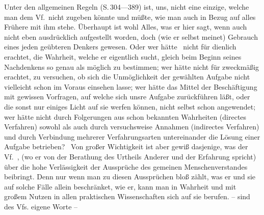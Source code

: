 Unter den allgemeinen Regeln (S.\,304---389) ist,  uns, nicht eine einzige, welche man dem Vf.\ nicht zugeben könnte und müßte, wie man auch in Bezug auf alles Frühere mit ihm stehe. Überhaupt ist wohl Alles, was er hier sagt, wenn auch nicht eben ausdrücklich aufgestellt worden, doch (wie er selbst meinet) Gebrauch eines jeden geübteren Denkers gewesen. Oder wer hätte \zB\ nicht für dienlich erachtet, die Wahrheit, welche er eigentlich sucht, gleich beim Beginn seines Nachdenkens so genau als möglich zu bestimmen; wer hätte nicht für zweckmäßig erachtet, zu versuchen, ob sich die Unmöglichkeit der gewählten Aufgabe nicht vielleicht schon im Voraus einsehen lasse; wer hätte das Mittel der Beschäftigung mit gewissen Vorfragen, auf welche sich unsre Aufgabe zurückführen läßt, oder die sonst nur einiges Licht auf sie werfen können, nicht selbst schon angewendet; wer hätte nicht durch Folgerungen aus schon bekannten Wahrheiten (directes Verfahren) sowohl als auch durch versuchsweise Annahmen (indirectes Verfahren) und durch Verbindung mehrerer Verfahrungsarten untereinander die Lösung einer Aufgabe betrieben? \usw\ Von großer Wichtigkeit ist aber gewiß dasjenige, was der Vf.\ , (wo er von der Berathung des Urtheils Anderer und der Erfahrung spricht) über die hohe Verlässigkeit der Aussprüche des gemeinen Menschenverstandes beibringt. Denn nur wenn man zu diesen Aussprüchen bloß zählt, was er und sie auf solche Fälle allein beschränket, wie er, kann man in Wahrheit und mit großem Nutzen in allen praktischen Wissenschaften sich auf sie berufen.  -- sind des Vfs. eigene Worte -- 
